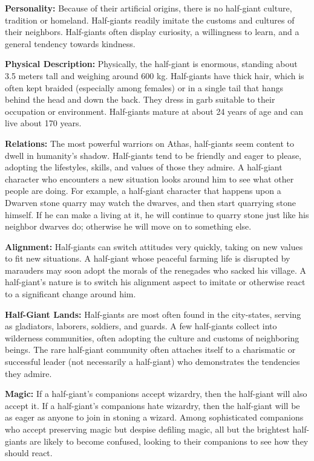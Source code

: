 \textbf{Personality:} Because of their artificial origins, there is no half-giant culture, tradition or homeland. Half-giants readily imitate the customs and cultures of their neighbors. Half-giants often display curiosity, a willingness to learn, and a general tendency towards kindness.

\textbf{Physical Description:} Physically, the half-giant is enormous, standing about 3.5 meters tall and weighing around 600 kg. Half-giants have thick hair, which is often kept braided (especially among females) or in a single tail that hangs behind the head and down the back. They dress in garb suitable to their occupation or environment. Half-giants mature at about 24 years of age and can live about 170 years.

\textbf{Relations:} The most powerful warriors on Athas, half-giants seem content to dwell in humanity's shadow. Half-giants tend to be friendly and eager to please, adopting the lifestyles, skills, and values of those they admire. A half-giant character who encounters a new situation looks around him to see what other people are doing. For example, a half-giant character that happens upon a Dwarven stone quarry may watch the dwarves, and then start quarrying stone himself. If he can make a living at it, he will continue to quarry stone just like his neighbor dwarves do; otherwise he will move on to something else.

\textbf{Alignment:} Half-giants can switch attitudes very quickly, taking on new values to fit new situations. A half-giant whose peaceful farming life is disrupted by marauders may soon adopt the morals of the renegades who sacked his village. A half-giant's nature is to switch his alignment aspect to imitate or otherwise react to a significant change around him.

\textbf{Half-Giant Lands:} Half-giants are most often found in the city-states, serving as gladiators, laborers, soldiers, and guards. A few half-giants collect into wilderness communities, often adopting the culture and customs of neighboring beings. The rare half-giant community often attaches itself to a charismatic or successful leader (not necessarily a half-giant) who demonstrates the tendencies they admire.

\textbf{Magic:} If a half-giant's companions accept wizardry, then the half-giant will also accept it. If a half-giant's companions hate wizardry, then the half-giant will be as eager as anyone to join in stoning a wizard. Among sophisticated companions who accept preserving magic but despise defiling magic, all but the brightest half-giants are likely to become confused, looking to their companions to see how they should react.


